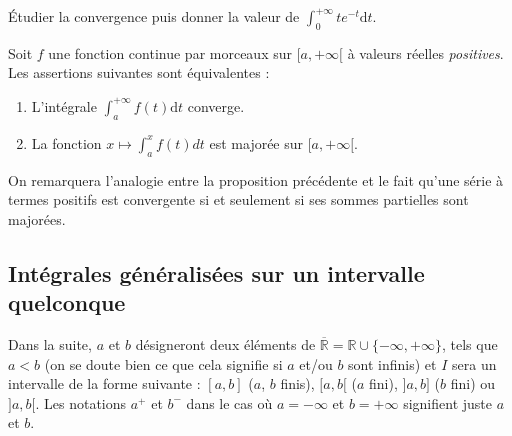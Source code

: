 \documentclass[french,11pt,twoside]{VcCours}
\newcommand{\dt}{\text{d}t}
\begin{document}
\begin{ApplicationDirecte}{} Étudier la convergence puis donner la valeur de $\int_{0}^{+ \infty} t e^{-t} \dt$.
\end{ApplicationDirecte}

\begin{Proposition}{} Soit $f$ une fonction continue par morceaux sur $[a,+\infty[$ à valeurs réelles \emph{positives}. Les assertions suivantes sont équivalentes :
\begin{enumerate}
\item L'intégrale $\int_a^{+\infty} f(t) \dt$ converge.
\item La fonction $x \mapsto \int_{a}^x f(t) dt$ est majorée sur $[a,+\infty[$.
\end{enumerate}
\end{Proposition}

\begin{Demonstration}{} 

	\vspace{4cm}
%
\end{Demonstration}

\begin{Remarque}{} On remarquera l'analogie entre la proposition précédente et le fait qu'une série à termes positifs est convergente si et seulement si ses sommes partielles sont majorées.
\end{Remarque}

\newpage
\subsection{Intégrales généralisées sur un intervalle quelconque}
Dans la suite, $a$ et $b$ désigneront deux éléments de $\overline{\mathbb{R}} = \mathbb{R} \cup \lbrace - \infty, + \infty \rbrace$, tels que $a<b$ (on se doute bien ce que cela signifie si $a$ et/ou $b$ sont infinis) et $I$ sera un intervalle de la forme suivante : $[a,b]$ ($a$, $b$ finis), $[a,b[$ ($a$ fini), $]a,b]$ ($b$ fini) ou $]a,b[$. Les notations $a^+$ et $b^{-}$ dans le cas où $a= - \infty$ et $b = + \infty$ signifient juste $a$ et $b$.
\end{document}
